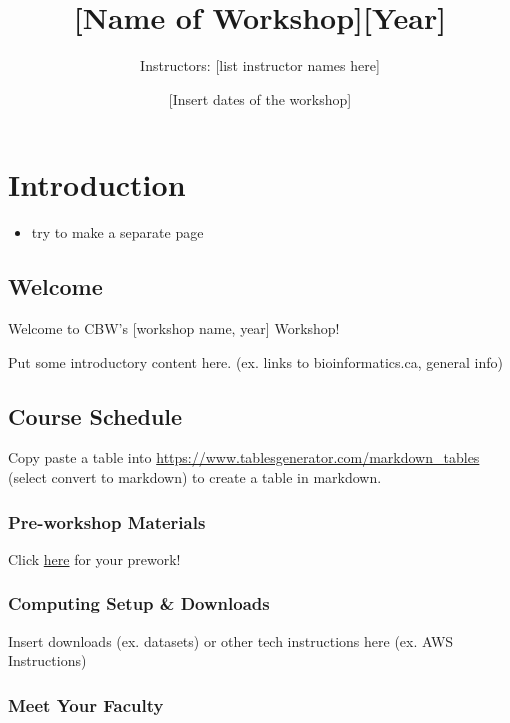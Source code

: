 \documentclass[
]{book}
\title{{[}Name of Workshop{]}{[}Year{]}}
\author{Instructors: {[}list instructor names here{]}}
\date{{[}Insert dates of the workshop{]}}
\providecommand{\tightlist}{%
  \setlength{\itemsep}{0pt}\setlength{\parskip}{0pt}}
\begin{document}
\maketitle

{
\setcounter{tocdepth}{1}
\tableofcontents
}
\part{Introduction}\label{part-introduction}

\begin{itemize}
\tightlist
\item
  try to make a separate page
\end{itemize}

\chapter{Welcome}\label{welcome}

Welcome to CBW's {[}workshop name, year{]} Workshop!

Put some introductory content here. (ex. links to bioinformatics.ca, general info)

\chapter{Course Schedule}\label{course-schedule}

Copy paste a table into \url{https://www.tablesgenerator.com/markdown_tables} (select convert to markdown) to create a table in markdown.

\section{Pre-workshop Materials}\label{pre-workshop-materials}

Click \href{insert\%20link\%20here}{here} for your prework!

\section{Computing Setup \& Downloads}\label{computing-setup-downloads}

Insert downloads (ex. datasets) or other tech instructions here (ex. AWS Instructions)

\section{Meet Your Faculty}\label{meet-your-faculty}
\end{document}
